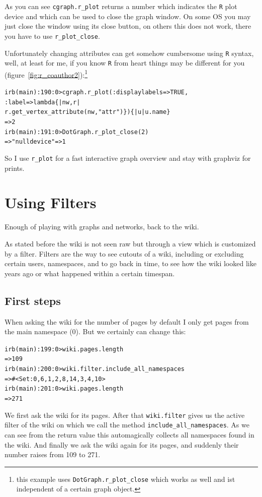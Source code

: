 \documentclass[a4paper]{scrartcl}
\newcounter{tcounter}
\newcommand{\tcount}{\makebox[0pt][r]{\tiny\thetcounter~}}
\newenvironment{typed}{\refstepcounter{tcounter}\bgroup\setlength{\topsep}{0pt}\renewcommand{\FrameCommand}[1]{\fcolorbox{black!30}{bgcolor}{##1}\tcount}\MakeFramed{\FrameRestore}\begin{alltt}\small}{\end{alltt}\endMakeFramed\egroup\par\aftergroup\noindent\aftergroup\ignorespaces}
\newcommand{\code}[1]{\texttt{\color{code}#1}}
\newcommand{\cmd}[1]{\texttt{\color{cmd}#1}}
\newcommand{\p}{\textcolor{prompt}}
\renewcommand{\c}{\textcolor{cmd}}
\begin{document}
As you can see \cmd{cgraph.r\_plot} returns a number which indicates
the \code{R} plot device and which can be used to close the graph
window. On some OS you may just close the window using its close
button, on others this does not work, there you have to use
\cmd{r\_plot\_close}.

Unfortunately changing attributes can get somehow cumbersome using
\code{R} syntax, well, at least for me, if you know \code{R} from
heart things may be different for you
(figure~\ref{fig:r_coauthor2}):\footnote{this example uses
  \cmd{DotGraph.r\_plot\_close} which works as well and ist independent
  of a certain graph object.}
\begin{typed}
\p{irb(main):190:0>} \c{cgraph.r_plot(:displaylabels => TRUE,
                     :label => lambda \{ |nw,r| 
                        r.get_vertex_attribute(nw, "attr")\}) \{ |u| u.name \}}
=> 2
\p{irb(main):191:0>} \c{DotGraph.r_plot_close(2)}
=> {"null device"=>1}
\end{typed}
So I use \cmd{r\_plot} for a fast interactive graph overview and stay
with graphviz for prints.

\section{Using Filters}
\label{sec:filters}

Enough of playing with graphs and networks, back to the wiki.

As stated before the wiki is not seen raw but through a view which is
customized by a filter. Filters are the way to see cutouts of a wiki,
including or excluding certain users, namespaces, and to go back in
time, to see how the wiki looked like years ago or what happened
within a certain timespan.

\subsection{First steps}
\label{sec:filters-first}

When asking the wiki for the number of pages by default I only get
pages from the main namespace (0). But we certainly can change this:
\begin{typed}
\p{irb(main):199:0>} \c{wiki.pages.length}
=> 109
\p{irb(main):200:0>} \c{wiki.filter.include_all_namespaces}
=> #<Set: {0, 6, 1, 2, 8, 14, 3, 4, 10}>
\p{irb(main):201:0>} \c{wiki.pages.length}
=> 271
\end{typed}
We first ask the wiki for its pages. After that \cmd{wiki.filter}
gives us the active filter of the wiki on which we call the method
\cmd{include\_all\_namespaces}. As we can see from the return value
this automagically collects all namespaces found in the wiki. And
finally we ask the wiki again for its pages, and suddenly their number
raises from 109 to 271.
\bigskip
\end{document}

